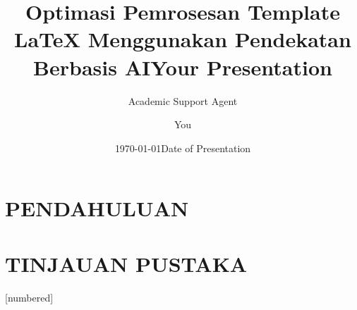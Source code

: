 \documentclass{beamer}
\title{Optimasi Pemrosesan Template LaTeX Menggunakan Pendekatan Berbasis AI}
\author{Academic Support Agent}
\date{\today}
\begin{document}
\maketitle

\begin{abstract}

\end{abstract}

\chapter{PENDAHULUAN}


\chapter{TINJAUAN PUSTAKA}


%
%
%
{
  [numbered]
} 

\usepackage[english]{babel}
\usepackage[utf8]{inputenc}
\usepackage[T1]{fontenc}

\title[Your Short Title]{Your Presentation}
\author{You}
\date{Date of Presentation}
\end{document}
